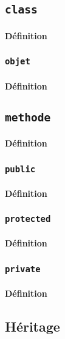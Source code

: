 \documentclass{article}
\begin{document}
\subsection{\texttt{class}}
\paragraph{Définition}

\subsubsection{\texttt{objet}}
\paragraph{Définition}

\subsection{\texttt{methode}}
\paragraph{Définition}

\subsubsection{\texttt{public}}
\paragraph{Définition}

\subsubsection{\texttt{protected}}
\paragraph{Définition}

\subsubsection{\texttt{private}}
\paragraph{Définition}

\subsection{Héritage}
\end{document}
